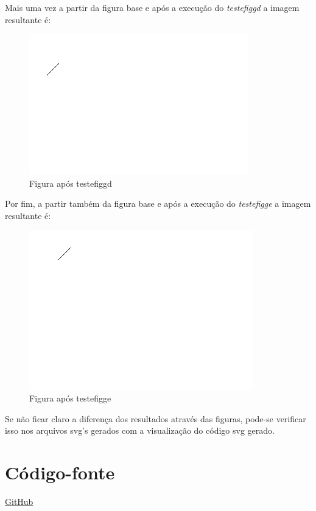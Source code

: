 \documentclass[12pt]{article}
\begin{document}
Mais uma vez a partir da figura base e após a execução do \emph{testefiggd} a imagem resultante é:
\begin{figure}[H]
  \includegraphics[width=\linewidth]{04_depois_testefiggd.png}
  \caption{Figura após testefiggd}
\end{figure}

Por fim, a partir também da figura base e após a execução do \emph{testefigge} a imagem resultante é:
\begin{figure}[H]
  \includegraphics[width=\linewidth]{05_depois_testefigge.png}
  \caption{Figura após testefigge}
\end{figure}

Se não ficar claro a diferença dos resultados através das figuras, pode-se verificar isso nos arquivos svg's gerados com a visualização do código svg gerado.

\section{Código-fonte}
\href{https://github.com/lucasjoao/paradigmas/tree/master/Prolog/T2c}
{GitHub}
\end{document}
